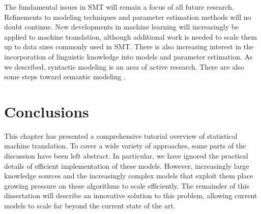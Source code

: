 The fundamental issues in 
SMT will remain a focus of all future research.
Refinements to modeling techniques and parameter
estimation methods will no doubt continue.
New developments in machine learning will
increasingly be applied to machine translation,
although additional work is needed to scale them
up to data sizes commonly used in SMT.  There is
also increasing interest in the incorporation of
linguistic knowledge into models and parameter estimation.
As we described, syntactic modeling is an area
of active research.  There are also some steps
toward semantic modeling \citep{Carpuat:2005:acl,Carpuat:2007:emnlp-conll,Chan:2007:acl}.

\section{Conclusions}

This chapter has presented a comprehensive tutorial
overview of statistical machine translation.  To cover 
a wide variety of approaches, some parts of the discussion
have been left abstract.  In particular, we have ignored the
practical details of efficient implementation of these models.
However, increasingly large knowledge sources and the
increasingly complex models that exploit them
place growing pressure on these algorithms to scale
efficiently.  The remainder of this dissertation will
describe an innovative solution to this problem, allowing
current models to scale far beyond the current state of the
art.


